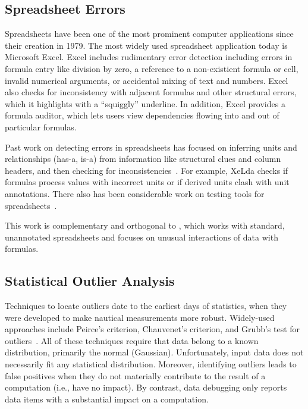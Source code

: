 \subsection*{Spreadsheet Errors}

Spreadsheets have been one of the most prominent computer applications
since their creation in 1979.
 The most widely used spreadsheet application today is Microsoft
Excel. Excel includes rudimentary error detection including errors in
formula entry like division by zero, a reference to a non-existient
formula or cell, invalid numerical arguments, or accidental mixing of
text and numbers.
Excel also checks for inconsistency with adjacent formulas and other
structural errors, which it highlights with a ``squiggly'' underline. In addition, Excel provides a formula auditor, which lets users view dependencies flowing into and out of particular formulas.

Past work on detecting errors in spreadsheets has focused on inferring
units and relationships (has-a, is-a) from information like structural
clues and column
headers, and then checking for inconsistencies~\cite{Antoniu:2004:VUC:998675.999448,DBLP:conf/kbse/AhmadAGK03,Chambers:2010:RSL:1860134.1860346,Erwig:2009:SES:1608570.1608694,Erwig:2005:AGM:1062455.1062494}. For
example, XeLda checks if formulas process values with incorrect units
or if derived units clash with unit annotations. There also has been
considerable work on testing tools for
spreadsheets~\cite{fisher2006scaling,rothermel1998you,rothermel2001methodology,Carver:2006:EET:1159733.1159775}.

This work is complementary and orthogonal to \checkcell{}, which
works with standard, unannotated spreadsheets and focuses on unusual
interactions of data with formulas.



\subsection*{Statistical Outlier Analysis}

Techniques to locate outliers date to the earliest days of statistics,
when they were developed to make nautical measurements more
robust. Widely-used approaches include Peirce's criterion, Chauvenet's
criterion, and Grubb's test for
outliers~\cite{barnett1994outliers}. All of these techniques require
that data belong to a known distribution, primarily the normal
(Gaussian). Unfortunately, input data does not necessarily fit any
statistical distribution. Moreover, identifying outliers leads to
false positives when they do not materially contribute to the result
of a computation (i.e., have no impact). By contrast, data debugging only reports
data items with a substantial impact on a computation.


